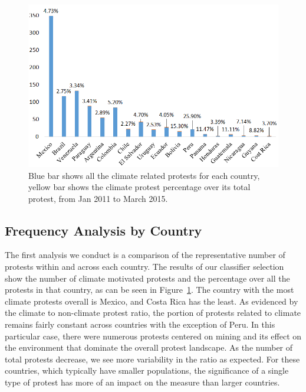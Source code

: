 \begin{figure}[htb]
\centerline
{\includegraphics[width=.8\textwidth]{figures/month-country-protest3}}
\caption{Blue bar shows all the climate related protests for each country, yellow bar shows the climate protest percentage over its total protest, from Jan 2011 to March 2015.}
\label{month_percentage}
\end{figure}

\subsection{Frequency Analysis by Country}
The first analysis we conduct is a comparison of the representative number of protests within and across each country.
The results of our classifier selection show the number of climate motivated protests and the percentage over all the protests in that country, as can be seen in Figure~\ref{month_percentage}.
The country with the most climate protests overall is Mexico, and Costa Rica has the least.
As evidenced by the climate to non-climate protest ratio, the portion of protests related to climate remains fairly constant across countries with the exception of Peru.
In this particular case, there were numerous protests centered on mining and its effect on the environment that dominate the overall protest landscape.
As the number of total protests decrease, we see more variability in the ratio as expected.
For these countries, which typically have smaller populations, the significance of a single type of protest has more of an impact on the measure than larger countries.


